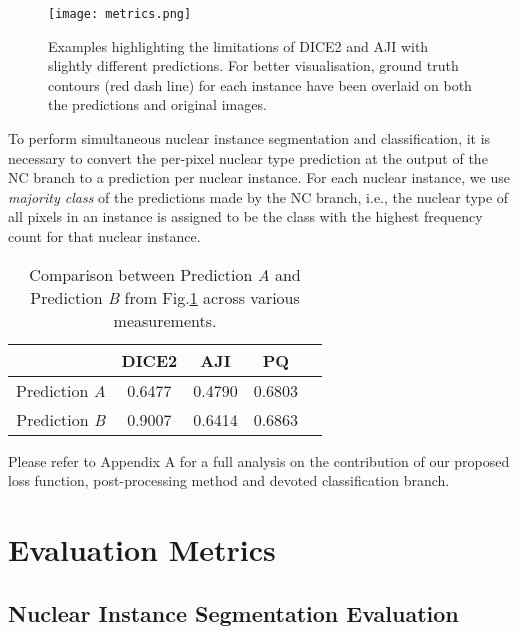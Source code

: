 \documentclass[journal]{IEEEtran}
\begin{document}
			\begin{figure}[!t]
		\centering
        \texttt{[image: metrics.png]}
		\caption{Examples highlighting the limitations of DICE2 and AJI with slightly different predictions. For better visualisation, ground truth contours (red dash line) for each instance have been overlaid on both the predictions and original images.} 
		\label{fig:dice2_aji_problem}
	\end{figure}
	
	
	To perform simultaneous nuclear instance segmentation and classification, it is necessary to convert the per-pixel nuclear type prediction at the output of the NC branch to a prediction per nuclear instance. For each nuclear instance, we use {\em majority class} of the predictions made by the NC branch, i.e., the nuclear type of all pixels in an instance is assigned to be the class with the highest frequency count for that nuclear instance.
	
	   \begin{table}[!t]
	\begin{center}
		\caption{Comparison between Prediction \textit{A} and Prediction \textit{B} from Fig.\ref{fig:dice2_aji_problem} across various measurements.}
		\setlength{\tabcolsep}{6pt} \renewcommand{\arraystretch}{1.0} \label{table:metrics_toy_results}
		\begin{tabular}{c|cccc}
			& \textbf{DICE2} & \textbf{AJI} & \textbf{PQ} \\
			\midrule
            Prediction \textit{A} & 0.6477 & 0.4790 & 0.6803 \\
            Prediction \textit{B} & 0.9007 & 0.6414 & 0.6863 \\
			\bottomrule
		\end{tabular}
	\end{center}
	\end{table}	
	
	
		
	Please refer to Appendix A for a full analysis on the contribution of our proposed loss function, post-processing method and devoted classification branch.
	
	\section{Evaluation Metrics} \label{section:metrics}
\subsection{Nuclear Instance Segmentation Evaluation} \label{section:metrics_inst}
\end{document}
